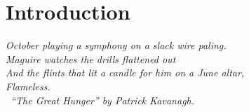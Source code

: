 \chapter{Introduction}
\textit{October playing a symphony on a slack wire paling.\\
Maguire watches the drills flattened out\\
And the flints that lit a candle for him on a June altar,\\
Flameless. \\
\vspace{.3cm}
\textemdash\ ``The Great Hunger'' by Patrick Kavanagh.} \citep{Kavanagh_Quinn_2006a}

